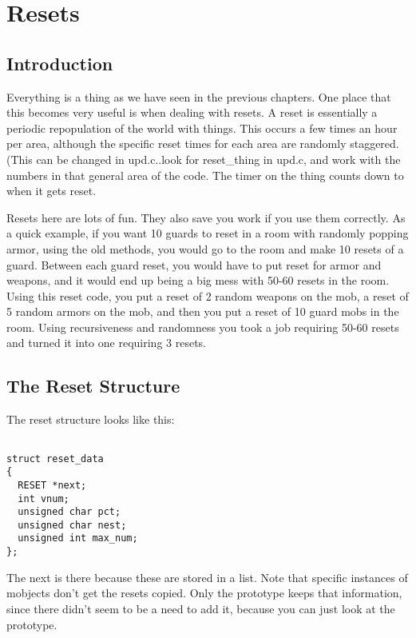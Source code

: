 \chapter{Resets}

\section{Introduction}

Everything is a thing as we have seen in the previous chapters. One
place that this becomes very useful is when dealing with resets.
A reset is essentially a periodic repopulation of the world with
things. This occurs a few times an hour per area, although the
specific reset times for each area are randomly staggered. 
(This can be changed in upd.c..look for reset\_thing in upd.c,
and work with the numbers in that general area of the code. The timer
on the thing counts down to when it gets reset.

Resets here are lots of fun. They also save you work if you use
them correctly. As a quick example, if you want 10 guards to reset
in a room with randomly popping armor, using the old methods,
you would go to the room and make 10 resets of a guard. Between each
guard reset, you would have to put reset for armor and weapons,
and it would end up being a big mess with 50-60 resets in the
room. Using this reset code, you put a reset of 2 random weapons on
the mob, a reset of 5 random armors on the mob, and then you put a
reset of 10 guard mobs in the room. Using recursiveness and randomness
you took a job requiring 50-60 resets and turned it into one requiring
3 resets.


\section{The Reset Structure}

The reset structure looks like this:

\begin{verbatim}

struct reset_data
{
  RESET *next;
  int vnum;
  unsigned char pct;
  unsigned char nest;
  unsigned int max_num;
};

\end{verbatim}

The next is there because these are stored in a list. Note that
specific instances of mobjects don't get the resets copied.
Only the prototype keeps that information, since there didn't
seem to be a need to add it, because you can just look at the
prototype. 


